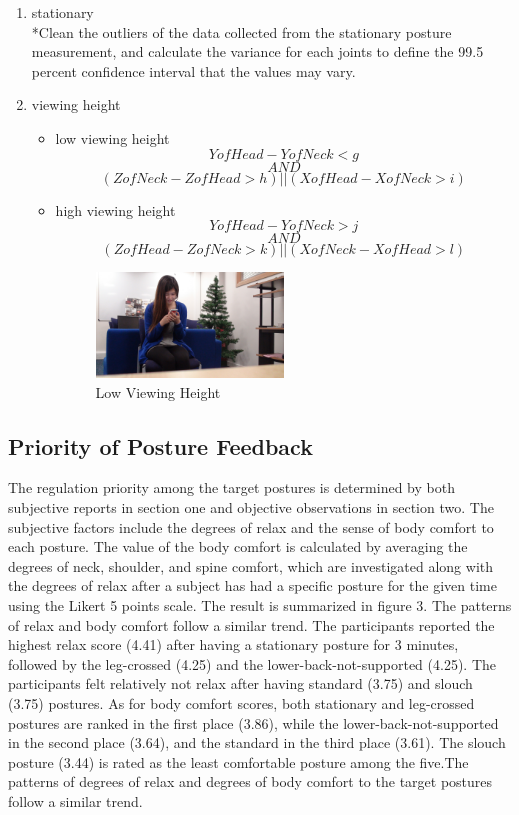 \begin{enumerate}
  \item stationary \hfill \\
  *Clean the outliers of the data collected from the stationary posture measurement, and calculate the variance for each joints to define the 99.5 percent confidence interval that the values may vary.
  \item viewing height
  \begin{itemize}
    \item low viewing height
    \[ Y of Head - Y of Neck < g\]
    \[ AND\]
    \[ (Z of Neck - Z of Head > h ) || ( X of Head - X of Neck > i)\]
    \item high viewing height
    \[Y of Head - Y of Neck > j\]
    \[ AND\]
    \[ (Z of Head- Z of Neck > k ) || (X of Neck- X of Head > l)\]
    \begin{figure}[h]
    \centering
      \includegraphics[width=0.5\textwidth]{figs/lh1}
    \caption{Low Viewing Height}
    \end{figure}
  \end{itemize}
\end{enumerate}

\subsection{Priority of Posture Feedback}
The regulation priority among the target postures is determined by both subjective reports in section one and objective observations in section two. The subjective factors include the degrees of relax and the sense of body comfort to each posture. The value of the body comfort is calculated by averaging the degrees of neck, shoulder, and spine comfort, which are investigated along with the degrees of relax after a subject has had a specific posture for the given time using the Likert 5 points scale. The result is summarized in figure 3. The patterns of relax and body comfort follow a similar trend. The participants reported the highest relax score (4.41) after having a stationary posture for 3 minutes, followed by the leg-crossed (4.25) and the lower-back-not-supported (4.25). The participants felt relatively not relax after having standard (3.75) and slouch (3.75) postures. As for body comfort scores, both stationary and leg-crossed postures are ranked in the first place (3.86), while the lower-back-not-supported in the second place (3.64), and the standard in the third place (3.61). The slouch posture (3.44) is rated as the least comfortable posture among the five.The patterns of degrees of relax and degrees of body comfort to the target postures follow a similar trend.

